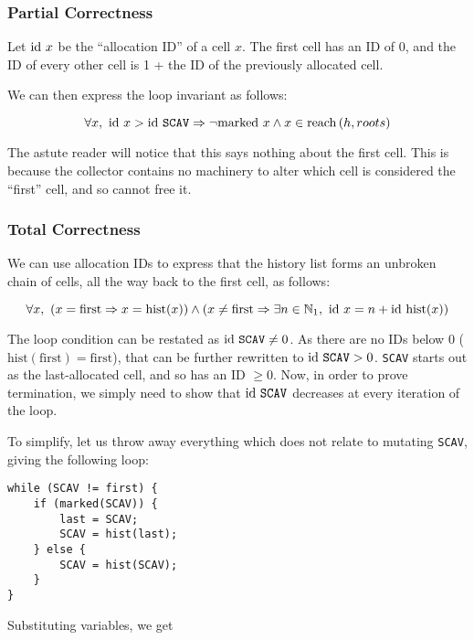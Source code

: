 \subsubsection{Partial Correctness}

Let $\mathrm{id}~x$ be the ``allocation ID'' of a cell $x$. The first cell has
an ID of 0, and the ID of every other cell is 1 + the ID of the
previously allocated cell.

We can then express the loop invariant as follows:

\[\forall x,\ \mathrm{id}~x > \mathrm{id}~\mathtt{SCAV} \Rightarrow
\lnot \mathrm{marked}~x \land x \in \mathrm{reach}\left(h, roots\right)\]

The astute reader will notice that this says nothing about the first
cell. This is because the collector contains no machinery to alter
which cell is considered the ``first'' cell, and so cannot free it.


\subsubsection{Total Correctness}

We can use allocation IDs to express that the history list forms an
unbroken chain of cells, all the way back to the first cell, as
follows:

\[\forall x,\ \left(x = \mathrm{first} \Rightarrow x =
  \mathrm{hist}(x)\right) \land \left(x \neq \mathrm{first} \Rightarrow
  \exists n \in \mathbb N_{1},\ \mathrm{id}~x = n + \mathrm{id}~\mathrm{hist}(x)\right)\]

The loop condition can be restated as $\mathrm{id}~\mathtt{SCAV} \neq 0$. As
there are no IDs below 0 ($\mathrm{hist}(\mathrm{first}) =
\mathrm{first}$), that can be further rewritten to $\mathrm{id}~\mathtt{SCAV}
> 0$. \texttt{SCAV} starts out as the last-allocated cell, and so has
an ID $\geq 0$. Now, in order to prove termination, we simply need to
show that $\mathrm{id}~\mathtt{SCAV}$ decreases at every iteration of the
loop.

To simplify, let us throw away everything which does not relate to
mutating \texttt{SCAV}, giving the following loop:

\begin{lstlisting}
while (SCAV != first) {
    if (marked(SCAV)) {
        last = SCAV;
        SCAV = hist(last);
    } else {
        SCAV = hist(SCAV);
    }
}
\end{lstlisting}

Substituting variables, we get

